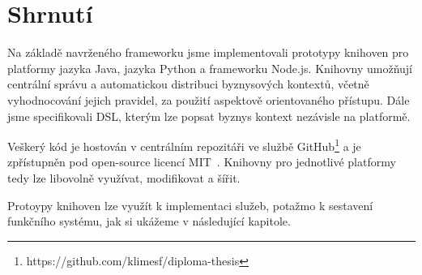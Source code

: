 \section{Shrnutí}

Na základě navrženého frameworku jsme implementovali prototypy
knihoven pro platformy jazyka Java, jazyka Python a frameworku
Node.js. Knihovny umožňují centrální správu a automatickou distribuci
byznysových kontextů, včetně vyhodnocování jejich pravidel, za
použití aspektově orientovaného přístupu.
Dále jsme specifikovali DSL, kterým lze popsat byznys kontext
nezávisle na platformě.

Veškerý kód je hostován v centrálním repozitáři
ve službě GitHub\footnote{
https://github.com/klimesf/diploma-thesis
} a je zpřístupněn pod open-source licencí MIT~\cite{mitlicense}.
Knihovny pro jednotlivé platformy tedy lze libovolně
využívat, modifikovat a šířit.

Protoypy knihoven lze využít k implementaci služeb,
potažmo k sestavení funkčního systému, jak si ukážeme
v následující kapitole.
